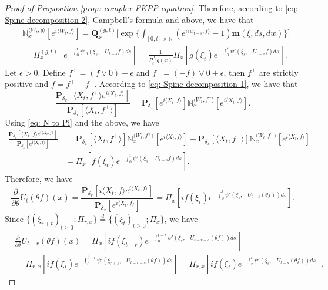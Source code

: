 \documentclass[12pt,a4paper]{amsart}
\theoremstyle{plain}
\theoremstyle{definition}
\numberwithin{equation}{section}
\begin{document}
\begin{proof}[Proof of Proposition \ref{prop: complex FKPP-equation}]
Therefore, according to \eqref{eq: Spine decomposition 2}, Campbell's formula and above, we have that
\begin{align}
  \label{eq: N to Pi}
    & \mathbb N_x^{\langle W_{t}, g\rangle}[e^{i \langle W_t, f\rangle}]
      = \mathbf Q_x^{(g,t)} \Big[\exp\Big\{\int_{[0,t]\times \mathbb N}(e^{i \langle w_{t-s}, f\rangle} - 1) \mathbf m(\xi, ds,dw)\Big\}\Big]
    \\ & = \Pi_x^{(g,t)} [e^{-\int_0^t \psi'_0(\xi_s, -U_{t-s}f)ds}]
    = \frac{1}{P_t^{\rho_1} g (x)} \Pi_x[ g(\xi_t) e^{-\int_0^t \psi'(\xi_s, -U_{t-s}f)ds} ].
\end{align}
Let $\epsilon >0$.
Define $f^+ = (f \vee 0) + \epsilon$ and $f^- = (-f) \vee 0 + \epsilon$, then $f^\pm$ are strictly positive and $f = f^+ - f^-$.
According to \eqref{eq: Spine decomposition 1}, we have that
\begin{equation}
  \frac{\mathbf P_{\delta_x}[\langle X_t,f^{\pm}\rangle e^{i \langle X_t,f\rangle}]}{\mathbf P_{\delta_x}[\langle X_t,f^{\pm}\rangle ]}
  = \mathbf P_{\delta_x}[e^{i \langle X_t,f\rangle}] \mathbb N_x^{\langle W_t,f^{\pm}\rangle}[e^{i \langle X_t,f\rangle}].
\end{equation}
Using \eqref{eq: N to Pi} and the above, we have
\begin{align}
  \frac{\mathbf P_{\delta_x}[\langle X_t, f\rangle e^{i \langle X_t, f\rangle}] }{\mathbf P_{\delta_x}[e^{i \langle X_t, f\rangle}]}
  & = \mathbf P_{\delta_x}[\langle X_t, f^+\rangle] \mathbb N_x^{\langle W_t, f^+\rangle} [e^{i \langle X_t, f\rangle}] - \mathbf P_{\delta_x}[\langle X_t, f^-\rangle]\mathbb N_x^{\langle W_t, f^-\rangle}[e^{i \langle X_t, f\rangle}]
  \\ & = \Pi_x[ f(\xi_t) e^{- \int_0^t \psi'(\xi_s, -U_{t-s}f) ds}  ].
\end{align}
Therefore, we have
\begin{equation}
  \frac{\partial}{\partial \theta} {U_t(\theta f)(x)}
  = \frac{\mathbf P_{\delta_x}[i\langle X_t, f\rangle e^{i \langle X_t, f\rangle}] }{\mathbf P_{\delta_x}[e^{i \langle X_t, f\rangle}]}
  = \Pi_x[ if(\xi_t) e^{ - \int_0^t \psi'(\xi_s, -U_{t-s}(\theta f)) ds} ].
\end{equation}
Since $\{(\xi_{r+t})_{t \geq 0}; \Pi_{r,x}\} \overset{d}{=} \{(\xi_{t})_{t\geq 0}; \Pi_{x}\} $, we have
\begin{align}
  & \frac{\partial}{\partial \theta} U_{t-r}(\theta f)( x)
    = \Pi_x[ i f(\xi_{t-r}) e^{-\int_0^{t-r} \psi'(\xi_s, -U_{t-r-s}(\theta f)) ds} ] \\ 
  & = \Pi_{r,x}[i f(\xi_t)e^{-\int_0^{t-r} \psi'(\xi_{r+s}, -U_{t-r-s}(\theta f)) ds} ]
    = \Pi_{r,x}[if(\xi_t)e^{-\int_r^t \psi'(\xi_{s}, -U_{t-s}(\theta f)) ds} ].
\end{align}


\end{proof}
\end{document}
